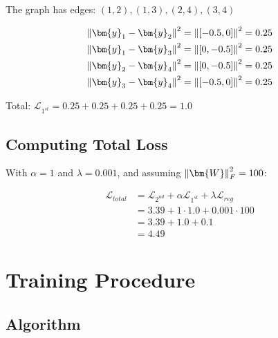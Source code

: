 \begin{notechapter}
\begin{example}
The graph has edges: $(1,2), (1,3), (2,4), (3,4)$

\begin{align*}
\norm{\bm{y}_1 - \bm{y}_2}^2 &= \norm{[-0.5, 0]}^2 = 0.25 \\
\norm{\bm{y}_1 - \bm{y}_3}^2 &= \norm{[0, -0.5]}^2 = 0.25 \\
\norm{\bm{y}_2 - \bm{y}_4}^2 &= \norm{[0, -0.5]}^2 = 0.25 \\
\norm{\bm{y}_3 - \bm{y}_4}^2 &= \norm{[-0.5, 0]}^2 = 0.25
\end{align*}

Total: $\mathcal{L}_{1^{st}} = 0.25 + 0.25 + 0.25 + 0.25 = 1.0$

\subsection*{Computing Total Loss}

With $\alpha = 1$ and $\lambda = 0.001$, and assuming $\norm{\bm{W}}^2_F = 100$:

\begin{align*}
\mathcal{L}_{total} &= \mathcal{L}_{2^{nd}} + \alpha \mathcal{L}_{1^{st}} + \lambda \mathcal{L}_{reg} \\
&= 3.39 + 1 \cdot 1.0 + 0.001 \cdot 100 \\
&= 3.39 + 1.0 + 0.1 \\
&= 4.49
\end{align*}
\end{example}

\section{Training Procedure}

\subsection{Algorithm}


\end{notechapter}
